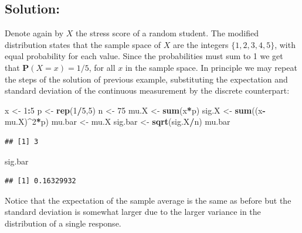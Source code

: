 \documentclass[]{krantz}
\makeatletter
\newenvironment{Shaded}{\begin{snugshade}}{\end{snugshade}}
\newcommand{\DecValTok}[1]{\textcolor[rgb]{0.00,0.00,0.81}{#1}}
\newcommand{\KeywordTok}[1]{\textcolor[rgb]{0.13,0.29,0.53}{\textbf{#1}}}
\newcommand{\NormalTok}[1]{#1}
\newcommand{\OperatorTok}[1]{\textcolor[rgb]{0.81,0.36,0.00}{\textbf{#1}}}
\newcommand{\StringTok}[1]{\textcolor[rgb]{0.31,0.60,0.02}{#1}}
\newcommand{\Prob}{\mathbf{P}}
\newenvironment{kframe}{%
\medskip{}
\setlength{\fboxsep}{.8em}
 \def\at@end@of@kframe{}%
 \ifinner\ifhmode%
  \def\at@end@of@kframe{\end{minipage}}%
  \begin{minipage}{\columnwidth}%
 \fi\fi%
 \def\FrameCommand##1{\hskip\@totalleftmargin \hskip-\fboxsep
 \colorbox{shadecolor}{##1}\hskip-\fboxsep
     \hskip-\linewidth \hskip-\@totalleftmargin \hskip\columnwidth}%
 \MakeFramed {\advance\hsize-\width
   \@totalleftmargin\z@ \linewidth\hsize
   \@setminipage}}%
 {\par\unskip\endMakeFramed%
 \at@end@of@kframe}
\renewenvironment{Shaded}{\begin{kframe}}{\end{kframe}}
\theoremstyle{definition}
\theoremstyle{definition}
\theoremstyle{definition}
\theoremstyle{remark}
\makeatother
\begin{document}
\hypertarget{solution-1}{%
\subsection*{Solution:}\label{solution-1}}


Denote again by \(X\) the stress score of a random student. The modified
distribution states that the sample space of \(X\) are the integers
\(\{1, 2, 3, 4, 5\}\), with equal probability for each value. Since the
probabilities must sum to 1 we get that \(\Prob(X = x) = 1/5\), for all
\(x\) in the sample space. In principle we may repeat the steps of the
solution of previous example, substituting the expectation and standard
deviation of the continuous measurement by the discrete counterpart:

\begin{Shaded}
\begin{Highlighting}[]
\NormalTok{x <-}\StringTok{ }\DecValTok{1}\OperatorTok{:}\DecValTok{5}
\NormalTok{p <-}\StringTok{ }\KeywordTok{rep}\NormalTok{(}\DecValTok{1}\OperatorTok{/}\DecValTok{5}\NormalTok{,}\DecValTok{5}\NormalTok{)}
\NormalTok{n <-}\StringTok{ }\DecValTok{75}
\NormalTok{mu.X <-}\StringTok{ }\KeywordTok{sum}\NormalTok{(x}\OperatorTok{*}\NormalTok{p)}
\NormalTok{sig.X <-}\StringTok{ }\KeywordTok{sum}\NormalTok{((x}\OperatorTok{-}\NormalTok{mu.X)}\OperatorTok{^}\DecValTok{2}\OperatorTok{*}\NormalTok{p)}
\NormalTok{mu.bar <-}\StringTok{ }\NormalTok{mu.X}
\NormalTok{sig.bar <-}\StringTok{ }\KeywordTok{sqrt}\NormalTok{(sig.X}\OperatorTok{/}\NormalTok{n)}
\NormalTok{mu.bar}
\end{Highlighting}
\end{Shaded}

\begin{verbatim}
## [1] 3
\end{verbatim}

\begin{Shaded}
\begin{Highlighting}[]
\NormalTok{sig.bar}
\end{Highlighting}
\end{Shaded}

\begin{verbatim}
## [1] 0.16329932
\end{verbatim}

Notice that the expectation of the sample average is the same as before
but the standard deviation is somewhat larger due to the larger variance
in the distribution of a single response.
\end{document}
